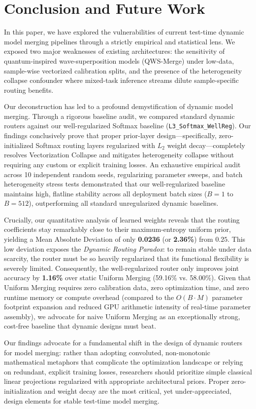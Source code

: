 \section{Conclusion and Future Work}
\label{sec:conclusion}

In this paper, we have explored the vulnerabilities of current test-time dynamic model merging pipelines through a strictly empirical and statistical lens. We exposed two major weaknesses of existing architectures: the sensitivity of quantum-inspired wave-superposition models (QWS-Merge) under low-data, sample-wise vectorized calibration splits, and the presence of the heterogeneity collapse confounder where mixed-task inference streams dilute sample-specific routing benefits.

Our deconstruction has led to a profound demystification of dynamic model merging. Through a rigorous baseline audit, we compared standard dynamic routers against our well-regularized Softmax baseline (\texttt{L3\_Softmax\_WellReg}). Our findings conclusively prove that proper prior-layer design---specifically, zero-initialized Softmax routing layers regularized with $L_2$ weight decay---completely resolves Vectorization Collapse and mitigates heterogeneity collapse without requiring any custom or explicit training losses. An exhaustive empirical audit across 10 independent random seeds, regularizing parameter sweeps, and batch heterogeneity stress tests demonstrated that our well-regularized baseline maintains high, flatline stability across all deployment batch sizes ($B=1$ to $B=512$), outperforming all standard unregularized dynamic baselines.

Crucially, our quantitative analysis of learned weights reveals that the routing coefficients stay remarkably close to their maximum-entropy uniform prior, yielding a Mean Absolute Deviation of only \textbf{0.0236} (or \textbf{2.36\%}) from $0.25$. This low deviation exposes the \emph{Dynamic Routing Paradox}: to remain stable under data scarcity, the router must be so heavily regularized that its functional flexibility is severely limited. Consequently, the well-regularized router only improves joint accuracy by \textbf{1.16\%} over static Uniform Merging (59.16\% vs. 58.00\%). Given that Uniform Merging requires zero calibration data, zero optimization time, and zero runtime memory or compute overhead (compared to the $O(B \cdot M)$ parameter footprint expansion and reduced GPU arithmetic intensity of real-time parameter assembly), we advocate for naive Uniform Merging as an exceptionally strong, cost-free baseline that dynamic designs must beat.

Our findings advocate for a fundamental shift in the design of dynamic routers for model merging: rather than adopting convoluted, non-monotonic mathematical metaphors that complicate the optimization landscape or relying on redundant, explicit training losses, researchers should prioritize simple classical linear projections regularized with appropriate architectural priors. Proper zero-initialization and weight decay are the most critical, yet under-appreciated, design elements for stable test-time model merging.
